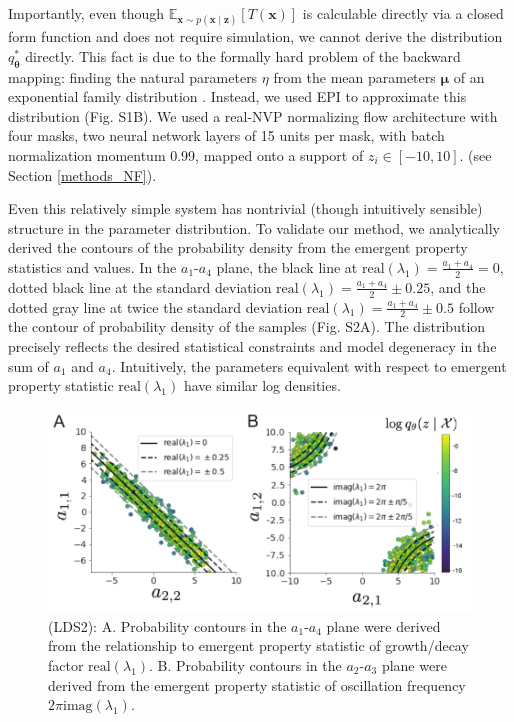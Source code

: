 \documentclass[11pt]{article}
\begin{document}
Importantly, even though $\mathbb{E}_{\mathbf{x}\sim p(\mathbf{x} \mid \mathbf{z})}\left[T(\mathbf{x})\right]$ is calculable directly via a closed form function and does not require simulation, we cannot derive the distribution $q^*_{\bm{\theta}}$ directly.  
This fact is due to the formally hard problem of the backward mapping: finding the natural parameters $\eta$ from the mean parameters $\bm{\mu}$ of an exponential family distribution \cite{wainwright2008graphical}.  
Instead, we used EPI to approximate this distribution (Fig. S1B). We used a real-NVP normalizing flow architecture with four masks, two neural network layers of 15 units per mask, with batch normalization momentum 0.99, mapped onto a support of $z_i \in \left[-10, 10 \right]$. (see Section \ref{methods_NF}).

Even this relatively simple system has nontrivial (though intuitively sensible) structure in the parameter distribution.  
To validate our method, we analytically derived the contours of the probability density from the emergent property statistics and values.
In the $a_1$-$a_4$ plane, the black line at $\text{real}(\lambda_1) = \frac{a_1 + a_4}{2} = 0$, dotted black line at
the standard deviation $\text{real}(\lambda_1) = \frac{a_1 + a_4}{2} \pm 0.25$, and the dotted gray line at twice the standard deviation
$\text{real}(\lambda_1) = \frac{a_1 + a_4}{2} \pm 0.5$ follow the contour of probability density of the samples (Fig. S2A). 
The distribution precisely reflects the desired statistical constraints and model degeneracy in the sum of $a_1$ and $a_4$.
Intuitively, the parameters equivalent with respect to emergent property statistic $\text{real}(\lambda_1)$ have similar log densities.

\begin{figure}
\begin{center}
\includegraphics[scale=0.8]{figures/figLDS2/figLDS2.pdf}
\end{center}
\begin{flushleft}
\caption{\small (LDS2): A. Probability contours in the $a_1$-$a_4$ plane were derived from the relationship to emergent property statistic of growth/decay factor $\text{real}(\lambda_1)$. 
B. Probability contours in the $a_2$-$a_3$ plane were derived from the emergent property statistic of oscillation frequency $2\pi \text{imag}(\lambda_1)$.}
\end{flushleft}
\label{fig:LDS2}
\end{figure}
\end{document}
